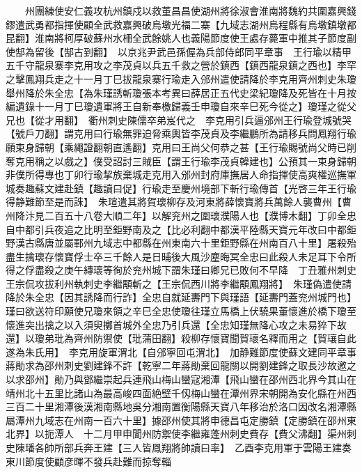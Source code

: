 　　州團練使安仁義攻杭州鎮戍以救董昌昌使湖州將徐淑會淮南將魏約共圍嘉興錢鏐遣武勇都指揮使顧全武救嘉興破烏墩光福二寨【九域志湖州烏程縣有烏墩鎮墩都昆翻】淮南將柯厚破蘇州水柵全武餘姚人也義陽節度使王處存薨軍中推其子節度副使郜為留後【郜古到翻】　以京兆尹武邑孫偓為兵部侍郎同平章事　王行瑜以精甲五千守龍泉寨李克用攻之李茂貞以兵五千救之營於鎮西【鎮西龍泉鎮之西也】李罕之擊鳳翔兵走之十一月丁巳拔龍泉寨行瑜走入邠州遣使請降於李克用齊州刺史朱瓊舉州降於朱全忠【為朱瑾誘斬瓊張本考異曰薛居正五代史梁紀瓊降及死皆在十月按編遺錄十一月丁巳瓊遺軍將王自新奉檄歸義壬申瓊自來辛巳死今從之】瓊瑾之從父兄也【從才用翻】　衢州刺史陳儒卒弟岌代之　李克用引兵逼邠州王行瑜登城號哭【號戶刀翻】謂克用曰行瑜無罪迫脅乘輿皆李茂貞及李繼鵬所為請移兵問鳳翔行瑜願束身歸朝【乘繩證翻朝直遙翻】克用曰王尚父何恭之甚【王行瑜賜號尚父時已削奪克用稱之以戲之】僕受詔討三賊臣【謂王行瑜李茂貞韓建也】公預其一束身歸朝非僕所得專也丁卯行瑜挈族棄城走克用入邠州封府庫撫居人命指揮使高爽權巡撫軍城奏趣蘇文建赴鎮【趣讀曰促】行瑜走至慶州境部下斬行瑜傳首【光啓三年王行瑜得静難節至是而誅】　朱瑄遣其將賀瓌柳存及河東將薛懷寶將兵萬餘人襲曹州【曹州降汴見二百五十八卷大順二年】以解兖州之圍瓌濮陽人也【濮博木翻】丁卯全忠自中都引兵夜追之比明至鉅野南及之【比必利翻中都漢平陸縣天寶元年改曰中都鉅野漢古縣唐並屬鄆州九域志中都縣在州東南六十里鉅野縣在州南百八十里】屠殺殆盡生擒瓌存懷寶俘士卒三千餘人是日晡後大風沙塵晦冥全忠曰此殺人未足耳下令所得之俘盡殺之庚午縳瓌等徇於兖州城下謂朱瑾曰卿兄已敗何不早降　丁丑雅州刺史王宗侃攻拔利州執刺史李繼顒斬之【王宗侃西川將李繼顒鳳翔將】　朱瑾偽遣使請降於朱全忠【因其誘降而行詐】全忠自就延夀門下與瑾語【延夀門蓋兖州城門也】瑾曰欲送符印願使兄瓊來領之辛巳全忠使瓊往瑾立馬橋上伏驍果董懷進於橋下瓊至懷進突出擒之以入須臾擲首城外全忠乃引兵還【全忠知瑾無降心攻之未易猝下故還】以瓊弟玭為齊州防禦使【玭蒲田翻】殺柳存懷寶聞賀瓌名釋而用之【賀瓖自此遂為朱氏用】　李克用旋軍渭北【自邠寧回屯渭北】　加静難節度使蘇文建同平章事　蔣勛求為邵州刺史劉建鋒不許【乾寧二年蔣勛棄回龍關以開劉建鋒之取長沙故邀之以求邵州】勛乃與鄧繼崇起兵連飛山梅山蠻寇湘潭【飛山蠻在邵州西北界今其山在靖州北十五里比諸山為最高峻四面絶壁千仭梅山蠻在潭州界宋朝開為安化縣在州西三百二十里湘潭後漢湘南縣地吳分湘南置衡陽縣天寶八年移治於洛口因改名湘潭縣屬潭州九域志在州南一百六十里】據邵州使其將申德昌屯定勝鎮【定勝鎮在邵州東北界】以扼潭人　十二月甲申閬州防禦使李繼雍蓬州刺史費存【費父沸翻】渠州刺史陳璠各帥所部兵奔王建【三人皆鳳翔將帥讀曰率】　乙酉李克用軍于雲陽王建奏東川節度使顧彦暉不發兵赴難而掠奪輜

